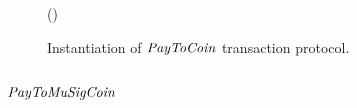 \begin{figure}
\begin{center}
{\begin{varwidth}{\textwidth}
{            \procVerfProof{\varProofBob}  \< \< \\
            \varSigAlice \opFunResult {} \< \< \\
            \varSigFin \opFunResult \procFinSig{\varSigAlice}{\varSigBob} \< \< \\
            \varExcess \opAssign {} \opAddPoint {} \< \< \\
            \pcreturn \varTx \opAssign \varTx \opConc (\varExcess \opSeperate \varSigFin)
            }
        \end{varwidth}
        }
    \end{center}
    \caption{Instantiation of $\mathit{PayToCoin}$ transaction protocol. \label{fig:payToCoin}}
\end{figure}

\subsection{$\mathit{PayToMuSigCoin}$}

